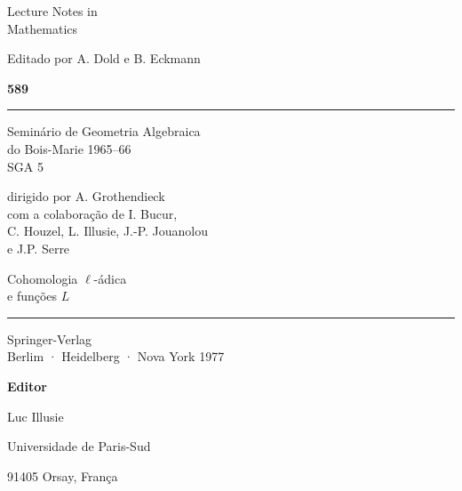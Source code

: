 \begin{titlepage}
\thispagestyle{empty}
\begin{center}
\begin{minipage}[t][0.92\textheight][s]{0.76\textwidth}
\raggedright
{\Large\sffamily Lecture Notes in\\ Mathematics}\par
\vspace{0.8em}
{Editado por A. Dold e B. Eckmann}\par
\vfill
{\Huge\bfseries 589}\par
\vspace{1.5em}
\rule{\linewidth}{0.8pt}\par
\vspace{1.5em}
{\LARGE Seminário de Geometria Algebraica\\ do Bois-Marie 1965--66\\ SGA 5}\par
\vspace{1em}
{\large dirigido por A. Grothendieck\\
com a colaboração de I. Bucur,\\
C. Houzel, L. Illusie, J.-P. Jouanolou\\
e J.P. Serre}\par
\vfill
{\LARGE Cohomologia $\ell$-ádica\\ e funções $L$}\par
\vspace{1.5em}
\rule{\linewidth}{0.8pt}\par
\vspace{0.8em}
\par
\vspace{0.5em}
{\Large Springer-Verlag\\ Berlim · Heidelberg · Nova York 1977}
\end{minipage}
\end{center}
\end{titlepage}

\clearpage
\thispagestyle{empty}
\hspace*{0.12\textwidth}\begin{minipage}{0.72\textwidth}
\textbf{Editor}\par
Luc Illusie\par
Universidade de Paris-Sud\par
91405 Orsay, França
\end{minipage}

